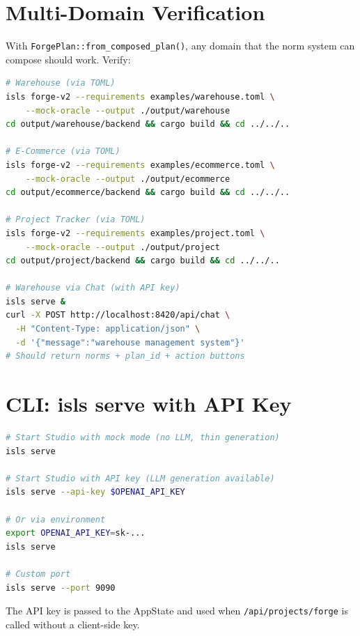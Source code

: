 \documentclass[11pt,a4paper]{article}
\begin{document}
\section{Multi-Domain Verification}

With \texttt{ForgePlan::from\_composed\_plan()}, any domain that
the norm system can compose should work. Verify:

\begin{lstlisting}[language=bash,title=Three Domains Must Work]
# Warehouse (via TOML)
isls forge-v2 --requirements examples/warehouse.toml \
    --mock-oracle --output ./output/warehouse
cd output/warehouse/backend && cargo build && cd ../../..

# E-Commerce (via TOML)
isls forge-v2 --requirements examples/ecommerce.toml \
    --mock-oracle --output ./output/ecommerce
cd output/ecommerce/backend && cargo build && cd ../../..

# Project Tracker (via TOML)
isls forge-v2 --requirements examples/project.toml \
    --mock-oracle --output ./output/project
cd output/project/backend && cargo build && cd ../../..

# Warehouse via Chat (with API key)
isls serve &
curl -X POST http://localhost:8420/api/chat \
  -H "Content-Type: application/json" \
  -d '{"message":"warehouse management system"}'
# Should return norms + plan_id + action buttons
\end{lstlisting}

\section{CLI: isls serve with API Key}

\begin{lstlisting}[language=bash]
# Start Studio with mock mode (no LLM, thin generation)
isls serve

# Start Studio with API key (LLM generation available)
isls serve --api-key $OPENAI_API_KEY

# Or via environment
export OPENAI_API_KEY=sk-...
isls serve

# Custom port
isls serve --port 9090
\end{lstlisting}

The API key is passed to the AppState and used when
\texttt{/api/projects/forge} is called without a client-side key.

\end{document}
